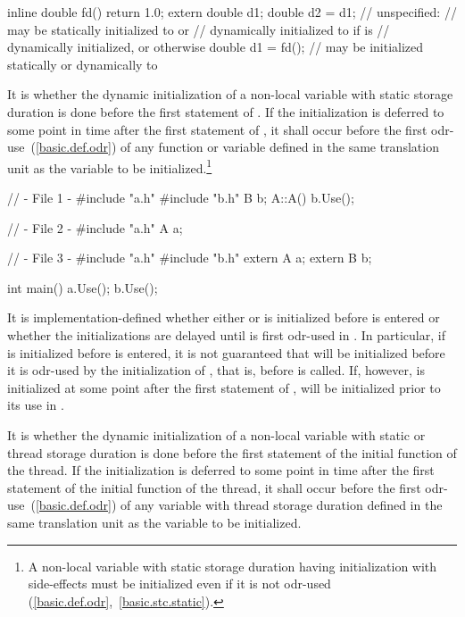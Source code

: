 \begin{codeblock}
inline double fd() { return 1.0; }
extern double d1;
double d2 = d1;     // unspecified:
                    // may be statically initialized to  or
                    // dynamically initialized to  if  is
                    // dynamically initialized, or  otherwise
double d1 = fd();   // may be initialized statically or dynamically to 
\end{codeblock}
\exitnote

\pnum
{}%
It is  whether the
dynamic initialization of a non-local variable with static storage duration is
done before the first statement of . If the initialization is deferred to
some point in time after the first statement of , it shall occur before the
first odr-use~(\ref{basic.def.odr}) of any function or variable
defined in the same translation unit as the variable
to be initialized.\footnote{A non-local variable with static storage duration
having initialization
with side-effects must be initialized even if it is not
odr-used (\ref{basic.def.odr},~\ref{basic.stc.static}).}
\enterexample 

\begin{codeblock}
// - File 1 -
#include "a.h"
#include "b.h"
B b;
A::A(){
  b.Use();
}

// - File 2 -
#include "a.h"
A a;

// - File 3 -
#include "a.h"
#include "b.h"
extern A a;
extern B b;

int main() {
  a.Use();
  b.Use();
}
\end{codeblock}

It is implementation-defined whether either  or  is
initialized before  is entered or whether the
initializations are delayed until  is first odr-used in
. In particular, if  is initialized before
 is entered, it is not guaranteed that  will be
initialized before it is odr-used by the initialization of , that
is, before  is called. If, however,  is initialized
at some point after the first statement of ,  will
be initialized prior to its use in . \exitexample

\pnum
It is  whether the
dynamic initialization of a non-local variable with static or
thread storage duration
is done before the first statement of the initial function of the thread. If the
initialization is deferred to some point in time after the first statement of the
initial function of the thread, it shall occur before the first
odr-use~(\ref{basic.def.odr}) of any variable with
thread storage duration defined in the same translation unit as the variable to be
initialized.

